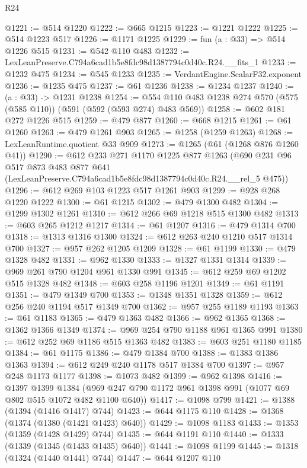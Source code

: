 \begin{lexlean}{R24}
\begin{coremodule}
@1221 := @514 @1220
@1222 := @665 @1215
@1223 := @1221 @1222
@1225 := @514 @1223 @517
@1226 := @1171 @1225
@1229 := fun (a : @33) => @514 @1226 @515
@1231 := @542 @110 @483
@1232 := LexLeanPreserve.C794a6cad1b5e8fdc98d1387794c0d40c.R24.__fits_1
@1233 := @1232 @475
@1234 := @545 @1233
@1235 := VerdantEngine.ScalarF32.exponent
@1236 := @1235 @475
@1237 := @61 @1236
@1238 := @1234 @1237
@1240 := (a : @33) -> @1231 @1238
@1254 := @554 @110 @483 @1238 @274 @570 (@575 (@585 @110)) (@591 (@592 (@593 @274) @483 @569))
@1258 := @602 @181 @272 @1226 @515
@1259 := @479 @877
@1260 := @668 @1215
@1261 := @61 @1260
@1263 := @479 @1261 @903
@1265 := @1258 (@1259 @1263)
@1268 := LexLeanRuntime.quotient @33 @909
@1273 := @1265 (@61 (@1268 @876 @1260 @41))
@1290 := @612
    @233
    @271
    @1170
    @1225
    @877
    @1263
    (@690
      @231
      @96
      @517
      @873
      @483
      @877
      @641
      (LexLeanPreserve.C794a6cad1b5e8fdc98d1387794c0d40c.R24.__rel_5 @475))
@1296 := @612 @269 @103 @1223 @517 @1261 @903
@1299 := @928 @268 @1220 @1222
@1300 := @61 @1215
@1302 := @479 @1300 @482
@1304 := @1299 @1302 @1261
@1310 := @612 @266 @69 @1218 @515 @1300 @482
@1313 := @603 @265 @1212 @1217
@1314 := @61 @1207
@1316 := @479 @1314 @700
@1318 := @1313 @1316 @1300
@1324 := @612 @263 @240 @1210 @517 @1314 @700
@1327 := @957 @262 @1205 @1209
@1328 := @61 @1199
@1330 := @479 @1328 @482
@1331 := @962 @1330
@1333 := @1327 @1331 @1314
@1339 := @969 @261 @790 @1204 @961 @1330 @991
@1345 := @612 @259 @69 @1202 @515 @1328 @482
@1348 := @603 @258 @1196 @1201
@1349 := @61 @1191
@1351 := @479 @1349 @700
@1353 := @1348 @1351 @1328
@1359 := @612 @256 @240 @1194 @517 @1349 @700
@1362 := @957 @255 @1189 @1193
@1363 := @61 @1183
@1365 := @479 @1363 @482
@1366 := @962 @1365
@1368 := @1362 @1366 @1349
@1374 := @969 @254 @790 @1188 @961 @1365 @991
@1380 := @612 @252 @69 @1186 @515 @1363 @482
@1383 := @603 @251 @1180 @1185
@1384 := @61 @1175
@1386 := @479 @1384 @700
@1388 := @1383 @1386 @1363
@1394 := @612 @249 @240 @1178 @517 @1384 @700
@1397 := @957 @248 @1173 @1177
@1398 := @1073 @482
@1399 := @962 @1398
@1416 := @1397
    @1399
    @1384
    (@969 @247 @790 @1172 @961 @1398 @991 (@1077 @69 @802 @515 @1072 @482 @1100 @640))
@1417 := @1098 @799
@1421 := @1388 (@1394 (@1416 @1417) @744)
@1423 := @644 @1175 @110
@1428 := @1368 (@1374 (@1380 (@1421 @1423) @640))
@1429 := @1098 @1183
@1433 := @1353 (@1359 (@1428 @1429) @744)
@1435 := @644 @1191 @110
@1440 := @1333 (@1339 (@1345 (@1433 @1435) @640))
@1441 := @1098 @1199
@1445 := @1318 (@1324 (@1440 @1441) @744)
@1447 := @644 @1207 @110

\end{coremodule}
\end{lexlean}
